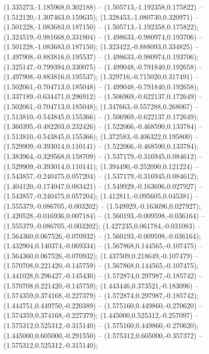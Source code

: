  (1.335273,-1.185968,0.302188) -- (1.505713,-1.192358,0.175822) -- (1.512120,-1.307463,0.159635);
 (1.328453,-1.080730,0.320971) -- (1.501228,-1.083683,0.187150) -- (1.505713,-1.192358,0.175822);
 (1.324519,-0.981668,0.331804) -- (1.498633,-0.980974,0.193706) -- (1.501228,-1.083683,0.187150);
 (1.323422,-0.888093,0.334825) -- (1.497908,-0.883816,0.195537) -- (1.498633,-0.980974,0.193706);
 (1.325147,-0.799394,0.330075) -- (1.499048,-0.791840,0.192658) -- (1.497908,-0.883816,0.195537);
 (1.329716,-0.715020,0.317491) -- (1.502061,-0.704713,0.185048) -- (1.499048,-0.791840,0.192658);
 (1.337189,-0.634471,0.296912) -- (1.506969,-0.622137,0.172649) -- (1.502061,-0.704713,0.185048);
 (1.347663,-0.557288,0.268067) -- (1.513810,-0.543845,0.155366) -- (1.506969,-0.622137,0.172649);
 (1.360395,-0.482203,0.232426) -- (1.522066,-0.468590,0.133784) -- (1.513810,-0.543845,0.155366);
 (1.372583,-0.406322,0.195800) -- (1.529909,-0.393014,0.110141) -- (1.522066,-0.468590,0.133784);
 (1.383964,-0.329568,0.158709) -- (1.537179,-0.316945,0.084612) -- (1.529909,-0.393014,0.110141);
 (1.394490,-0.252090,0.121224) -- (1.543857,-0.240475,0.057204) -- (1.537179,-0.316945,0.084612);
 (1.404120,-0.174047,0.083421) -- (1.549929,-0.163696,0.027927) -- (1.543857,-0.240475,0.057204);
 (1.412811,-0.095605,0.045381) -- (1.555379,-0.086705,-0.003202) -- (1.549929,-0.163696,0.027927);
 (1.420528,-0.016936,0.007184) -- (1.560193,-0.009598,-0.036164) -- (1.555379,-0.086705,-0.003202);
 (1.427235,0.061784,-0.031083) -- (1.564360,0.067526,-0.070932) -- (1.560193,-0.009598,-0.036164);
 (1.432904,0.140374,-0.069334) -- (1.567868,0.144565,-0.107475) -- (1.564360,0.067526,-0.070932);
 (1.437509,0.218649,-0.107479) -- (1.570708,0.221420,-0.145759) -- (1.567868,0.144565,-0.107475);
 (1.441028,0.296427,-0.145430) -- (1.572874,0.297987,-0.185742) -- (1.570708,0.221420,-0.145759);
 (1.443446,0.373521,-0.183096) -- (1.574359,0.374168,-0.227379) -- (1.572874,0.297987,-0.185742);
 (1.444751,0.449750,-0.220389) -- (1.575160,0.449860,-0.270620) -- (1.574359,0.374168,-0.227379);
 (1.445000,0.525312,-0.257097) -- (1.575312,0.525312,-0.315140) -- (1.575160,0.449860,-0.270620);
 (1.445000,0.605000,-0.291550) -- (1.575312,0.605000,-0.357372) -- (1.575312,0.525312,-0.315140);
